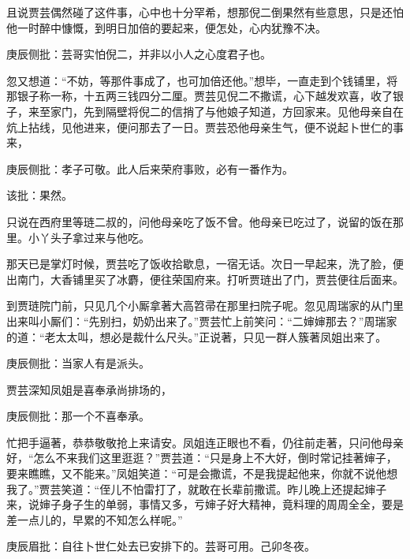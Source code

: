 \begin{parag}


    且说贾芸偶然碰了这件事，心中也十分罕希，想那倪二倒果然有些意思，只是还怕他一时醉中慷慨，到明日加倍的要起来，便怎处，心内犹豫不决。\begin{note}庚辰侧批：芸哥实怕倪二，并非以小人之心度君子也。\end{note}忽又想道：“不妨，等那件事成了，也可加倍还他。”想毕，一直走到个钱铺里，将那银子称一称，十五两三钱四分二厘。贾芸见倪二不撒谎，心下越发欢喜，收了银子，来至家门，先到隔壁将倪二的信捎了与他娘子知道，方回家来。见他母亲自在炕上拈线，见他进来，便问那去了一日。贾芸恐他母亲生气，便不说起卜世仁的事来，\begin{note}庚辰侧批：孝子可敬。此人后来荣府事败，必有一番作为。\end{note}\begin{note}该批：果然。\end{note}只说在西府里等琏二叔的，问他母亲吃了饭不曾。他母亲已吃过了，说留的饭在那里。小丫头子拿过来与他吃。
\end{parag}


\begin{parag}


    那天已是掌灯时候，贾芸吃了饭收拾歇息，一宿无话。次日一早起来，洗了脸，便出南门，大香铺里买了冰麝，便往荣国府来。打听贾琏出了门，贾芸便往后面来。
\end{parag}


\begin{parag}


    到贾琏院门前，只见几个小厮拿著大高笤帚在那里扫院子呢。忽见周瑞家的从门里出来叫小厮们：“先别扫，奶奶出来了。”贾芸忙上前笑问：“二婶婶那去？”周瑞家的道：“老太太叫，想必是裁什么尺头。”正说著，只见一群人簇著凤姐出来了。\begin{note}庚辰侧批：当家人有是派头。\end{note}贾芸深知凤姐是喜奉承尚排场的，\begin{note}庚辰侧批：那一个不喜奉承。\end{note}忙把手逼著，恭恭敬敬抢上来请安。凤姐连正眼也不看，仍往前走著，只问他母亲好，“怎么不来我们这里逛逛？”贾芸道：“只是身上不大好，倒时常记挂著婶子，要来瞧瞧，又不能来。”凤姐笑道：“可是会撒谎，不是我提起他来，你就不说他想我了。”贾芸笑道：“侄儿不怕雷打了，就敢在长辈前撒谎。昨儿晚上还提起婶子来，说婶子身子生的单弱，事情又多，亏婶子好大精神，竟料理的周周全全，要是差一点儿的，早累的不知怎么样呢。”\begin{note}庚辰眉批：自往卜世仁处去已安排下的。芸哥可用。己卯冬夜。\end{note}
\end{parag}


